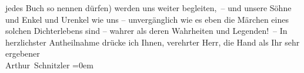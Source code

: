 \begin{ledgroupsized}[t]{13cm}
                    jedes Buch so nennen dürfen) werden uns weiter begleiten, – und unsere Söhne und
                    Enkel und Urenkel wie uns – unvergänglich wie es eben die Märchen eines solchen
                    Dichterlebens sind – wahrer als deren Wahrheiten und Legenden! –\pend
           \pstart
           In herzlichster Antheilnahme drücke ich Ihnen, verehrter Herr, die Hand als
                    Ihr sehr ergebener{\\[\baselineskip]}\spacefill\mbox{Arthur Schnitzler}\pend
           \leftskip=0em{}          \endnumbering{}\end{ledgroupsized}  \newcommand{\dateiname}{L02318}\newcommand{\titel}{Arthur Schnitzler an Georg Engländer, 10. 1. 1919}\newcommand{\editorInnen}{Martin Anton Müller und Gerd-Hermann Susen}
      
